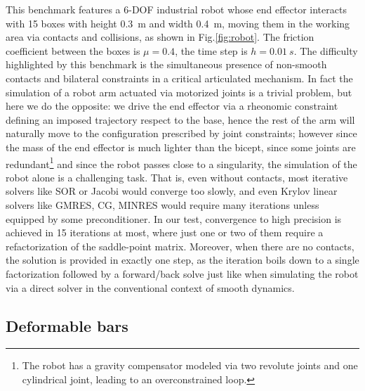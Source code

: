 \documentclass[AMA,STIX1COL]{WileyNJD-v2}
\begin{document}
This benchmark features a 6-DOF industrial robot whose end effector interacts with 15 boxes with height \SI{0.3}{m} and width \SI{0.4}{m}, moving them in the working area via contacts and collisions, as shown in Fig.\ref{fig:robot}. The friction coefficient between the boxes is $\mu=0.4$, the time step is $h=\SI{0.01}{s}$. The difficulty highlighted by this benchmark is the simultaneous presence of non-smooth contacts and bilateral constraints in a critical articulated mechanism. In fact the simulation of a robot arm actuated via motorized joints is a trivial problem, but here we do the opposite: we drive the end effector via a rheonomic constraint defining an imposed trajectory respect to the base, hence the rest of the arm will naturally move to the configuration prescribed by joint constraints; however since the mass of the end effector is much lighter than the bicept, since some joints are redundant\footnote{The robot has a gravity compensator modeled via two revolute joints and one cylindrical joint, leading to an overconstrained loop.} and since the robot passes close to a singularity, the simulation of the robot alone is a challenging task. That is, even without contacts, most iterative solvers like SOR or Jacobi would converge too slowly, and even Krylov linear solvers like GMRES, CG, MINRES would require many iterations unless equipped by some preconditioner. In our test, convergence to high precision is achieved in 15 iterations at most, where just one or two of them require a refactorization of the saddle-point matrix. Moreover, when there are no contacts, the solution is provided in exactly one step, as the iteration boils down to a single factorization followed by a forward/back solve just like when simulating the robot via a direct solver in the conventional context of smooth dynamics.
 


\subsection{Deformable bars}
\end{document}
